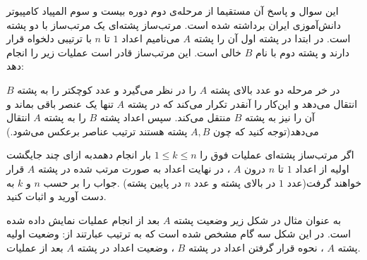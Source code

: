 \begin{PROBLEM}
	\p
	این سوال و پاسخ آن مستقیما از مرحله‌ی دوم دوره بیست و سوم المپیاد
	کامپیوتر دانش‌آموزی ایران برداشته شده است.
	مرتب‌ساز پشته‌ای یک مرتب‌ساز با دو پشته است. در ابتدا در پشته اول آن 
	را پشته 
	$A$
	می‌‌نامیم اعداد
	$1$
	تا
	$n$
	با ترتیبی دلخواه قرار دارند و پشته دوم با نام 
	$B$
	خالی است.
	این مرتب‌ساز قادر است عملیات زیر را انجام دهد:

	در خر مرحله دو عدد بالای پشته 
	$A$
	را در نظر می‌گیرد و عدد کوچکتر را به پشته
	$B$
	انتقال می‌دهد و این‌کار را آنقدر تکرار می‌کند که در پشته 
	$A$
	تنها یک عنصر باقی بماند و آن را نیز به پشته 
	$B$
	منتقل می‌کند. سپس اعداد پشته 
	$B$
	را به پشته 
	$A$
	انتقال می‌دهد(توجه کنید که چون 
	$A, B$
	پشته هستند ترتیب عناصر برعکس می‌شود.)

	اگر مرتب‌ساز پشته‌ای عملیات فوق را 
	$ 1 \leq k \leq n$
	بار انجام دهمدبه ازای چند جایگشت اولیه از اعداد 
	$1$
	تا
	$n$
	درون 
	$A$
	،
	در نهایت اعداد به صورت مرتب شده در پشته
	$A$
	قرار خواهند گرفت(عدد
	$1$
	در بالای پشته و عدد 
	$n$
	در پایین پشته)
	.جواب را بر حسب 
	$n$
	و
	$k$
	به دست آورید و اثبات کنید.

	\p
	به عنوان مثال در شکل زیر وضعیت پشته 
	$A$
	بعد از انجام عملیات نمایش داده شده است. در این شکل سه گام مشخص شده است
	که به ترتیب عبارتند از: وضعیت اولیه پشته
	$A$
	، نحوه قرار گرفتن اعداد در پشته
	$B$
	، وضعیت اعداد در پشته 
	$A$
	بعد از عملیات.

\end{PROBLEM}
